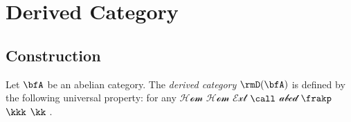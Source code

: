 \section{Derived Category}


\subsection{Construction}
    \begin{definition}\label{def:derived_category}
        Let \(\bfA\) be an abelian category. The \emph{derived category} \(\rmD(\bfA)\) is defined by the following universal property: 
        for any \(\mathcal{H\!o\!m}\) \(\mathcal{Hom}\) \(\mathcal{Ext}\) \(\call\) \(\mathscr{abcd}\) \(\frakp\) \(\kkk\) \(\kk\) .
    \end{definition}